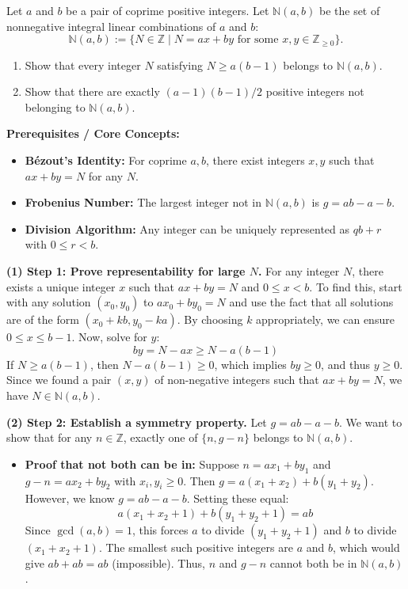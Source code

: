 \begin{exercise}
\label{algebra:2017:10}
Let $a$ and $b$ be a pair of coprime positive integers. Let $\mathbb{N}(a, b)$ be the set of nonnegative integral linear combinations of $a$ and $b$:
\[
\mathbb{N}(a, b) := \{N \in \mathbb{Z} \mid N = ax + by \text{ for some } x, y \in \mathbb{Z}_{\geq 0}\}.
\]
\begin{enumerate}
    \item Show that every integer $N$ satisfying $N \geq a(b-1)$ belongs to $\mathbb{N}(a, b)$.
    \item Show that there are exactly $(a-1)(b-1)/2$ positive integers not belonging to $\mathbb{N}(a, b)$.
\end{enumerate}
\end{exercise}
\begin{solution}
\textbf{Prerequisites / Core Concepts:}
\begin{itemize}
    \item \textbf{Bézout's Identity:} For coprime $a, b$, there exist integers $x, y$ such that $ax + by = N$ for any $N$.
    \item \textbf{Frobenius Number:} The largest integer not in $\mathbb{N}(a, b)$ is $g = ab - a - b$.
    \item \textbf{Division Algorithm:} Any integer can be uniquely represented as $q b + r$ with $0 \leq r < b$.
\end{itemize}

\textbf{(1) Step 1: Prove representability for large $N$.}
For any integer $N$, there exists a unique integer $x$ such that $ax + by = N$ and $0 \leq x < b$.
To find this, start with any solution $(x_0, y_0)$ to $ax_0 + by_0 = N$ and use the fact that all solutions are of the form $(x_0 + kb, y_0 - ka)$.
By choosing $k$ appropriately, we can ensure $0 \leq x \leq b-1$.
Now, solve for $y$:
\[ by = N - ax \geq N - a(b-1) \]
If $N \geq a(b-1)$, then $N - a(b-1) \geq 0$, which implies $by \geq 0$, and thus $y \geq 0$.
Since we found a pair $(x, y)$ of non-negative integers such that $ax + by = N$, we have $N \in \mathbb{N}(a, b)$.

\textbf{(2) Step 2: Establish a symmetry property.}
Let $g = ab - a - b$. We want to show that for any $n \in \mathbb{Z}$, exactly one of $\{n, g-n\}$ belongs to $\mathbb{N}(a, b)$.
\begin{itemize}
    \item \textbf{Proof that not both can be in:} Suppose $n = ax_1 + by_1$ and $g-n = ax_2 + by_2$ with $x_i, y_i \geq 0$.
    Then $g = a(x_1+x_2) + b(y_1+y_2)$.
    However, we know $g = ab - a - b$. Setting these equal:
    \[ a(x_1+x_2+1) + b(y_1+y_2+1) = ab \]
    Since $\gcd(a, b) = 1$, this forces $a$ to divide $(y_1+y_2+1)$ and $b$ to divide $(x_1+x_2+1)$.
    The smallest such positive integers are $a$ and $b$, which would give $ab + ab = ab$ (impossible).
    Thus, $n$ and $g-n$ cannot both be in $\mathbb{N}(a, b)$.
\end{itemize}


\end{solution}
